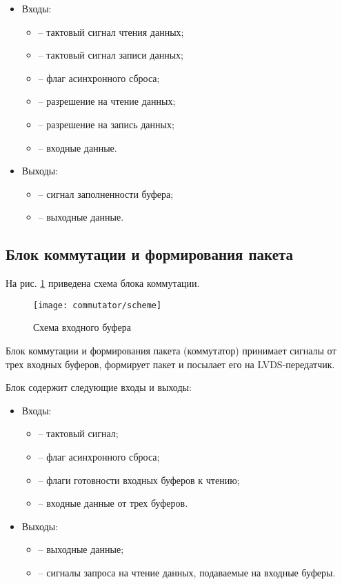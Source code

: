 \begin{itemize}
	\item Входы:
	\begin{itemize}
		\item {} -- тактовый сигнал чтения данных;
		\item {} -- тактовый сигнал записи данных;
		\item {} -- флаг асинхронного сброса;
		\item {} -- разрешение на чтение данных;
		\item {} -- разрешение на запись данных;
		\item {} -- входные данные.
	\end{itemize}
	\item Выходы:
	\begin{itemize}
		\item {} -- сигнал заполненности буфера;
		\item {} -- выходные данные. 
	\end{itemize}
\end{itemize}

\subsection{Блок коммутации и формирования пакета}

На рис. \ref{fig:commutator-scheme} приведена схема блока коммутации. 
\begin{figure}[H]
	\centering
	\texttt{[image: commutator/scheme]}
	\caption{Схема входного буфера}
	\label{fig:commutator-scheme}
\end{figure}

Блок коммутации и формирования пакета (коммутатор) принимает сигналы от трех входных буферов, формирует пакет и посылает его на LVDS-передатчик. 

Блок содержит следующие входы и выходы:

\begin{itemize}
	\item Входы:
	\begin{itemize}
		\item {} -- тактовый сигнал;
		\item {} -- флаг асинхронного сброса;
		\item {} -- флаги готовности входных буферов к чтению;
		\item {} -- входные данные от трех буферов.
	\end{itemize}
	\item Выходы:
	\begin{itemize}
		\item {} -- выходные данные;
		\item {} -- сигналы запроса на чтение данных, подаваемые на входные буферы.
	\end{itemize}
\end{itemize}


